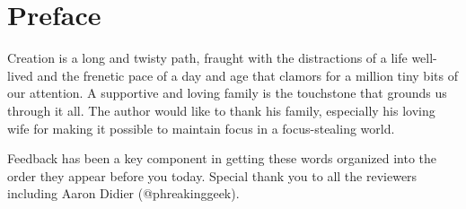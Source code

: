 \chapter*{Preface}
\vspace{5mm}

\justify
Creation is a long and twisty path, fraught with the distractions of
a life well-lived and the frenetic pace of a day and age that clamors
for a million tiny bits of our attention. A supportive and loving family
is the touchstone that grounds us through it all. The author would like
to thank his family, especially his loving wife for making it possible
to maintain focus in a focus-stealing world.

\justify
Feedback has been a key component in getting these words organized
into the order they appear before you today. Special thank you to all
the reviewers including Aaron Didier (@phreakinggeek).
